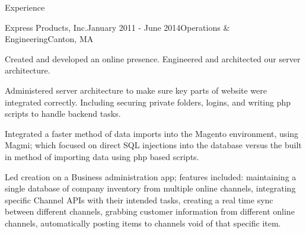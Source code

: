 \documentclass{resume} %
\begin{document}
\begin{rSection}{Experience}
\begin{rSubsection}{Express Products, Inc.}{January 2011 - June 2014}{Operations \& Engineering}{Canton, MA}
 	      \item Created and developed an online presence. Engineered and architected our server architecture. 
 	      \item Administered server architecture to make sure key parts of website were integrated correctly.
 	      Including securing private folders, logins, and writing php scripts to handle backend tasks.
          \item Integrated a faster method of data imports into the Magento environment, using Magmi; which 
          focused on direct SQL injections into the database versus the built in method of importing data using
           php based scripts.
          \item Led creation on a Business administration app; features included: maintaining a single database of company inventory from multiple online channels, integrating specific Channel APIs with their intended tasks, creating a real time sync between different channels, grabbing customer information from different online channels, automatically posting items to channels void of that specific item.
\end{rSubsection}



\end{rSection}


\end{document}
